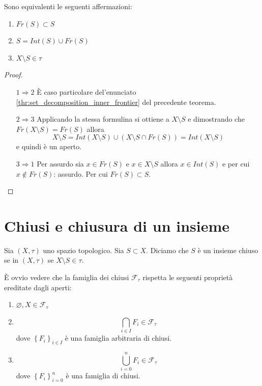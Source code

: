 \begin{theorem}
	Sono equivalenti le seguenti affermazioni:
	\begin{enumerate}
		\item $Fr(S) \subset S$
		\item $S = Int(S) \cup Fr(S)$
		\item $X \setminus S \in \tau$ 
	\end{enumerate}
\end{theorem}
\begin{proof}
	\begin{enumerate}
		\item[$1\Rightarrow 2$] È caso particolare del'enunciato \ref{thr:set_decomposition_inner_frontier} del precedente teorema.
		\item[$2 \Rightarrow 3$] Applicando la stessa formulina si ottiene a $X \setminus S$ e dimostrando che $Fr(X\setminus S) = Fr(S)$ allora 
		\begin{equation*}
			X \setminus S = Int(X\setminus S) \cup (X \setminus S \cap Fr(S)) = Int(X \setminus S)
		\end{equation*}
		 e quindi è un aperto.
		\item[$3 \Rightarrow 1$] Per assurdo sia $x \in Fr(S)$ e $x \in X \setminus S$ allora $x\in Int(S)$ e per cui $x \notin Fr(S)$: assurdo. Per cui $Fr(S) \subset S$.
	\end{enumerate}
\end{proof}

\section{Chiusi e chiusura di un insieme}

\begin{definition}
	Sia $(X, \tau)$ uno spazio topologico. Sia $S \subset X$. Diciamo che $S$ è un insieme chiuso se in $(X,\tau)$ se $X \setminus S \in \tau$.
\end{definition}

\begin{remark}
	È ovvio vedere che la famiglia dei chiusi $\mathcal{F}_\tau$ rispetta le seguenti proprietà ereditate dagli aperti:
	\begin{enumerate}
		\item $\varnothing, X \in \mathcal{F}_\tau$
		\item \begin{equation*}
				\bigcap_{i \in I} F_i \in \mathcal{F}_\tau
			\end{equation*}
		dove $\left\{F_i\right\}_{i\in I}$ è una famiglia arbitraria di chiusi.
		\item 
			\begin{equation*}
				\bigcup^{n}_{i = 0} F_i \in \mathcal{F}_\tau
			\end{equation*}
		dove $\left\{F_i\right\}^n_{i=0}$ è una famiglia di chiusi.
	\end{enumerate}
\end{remark}

